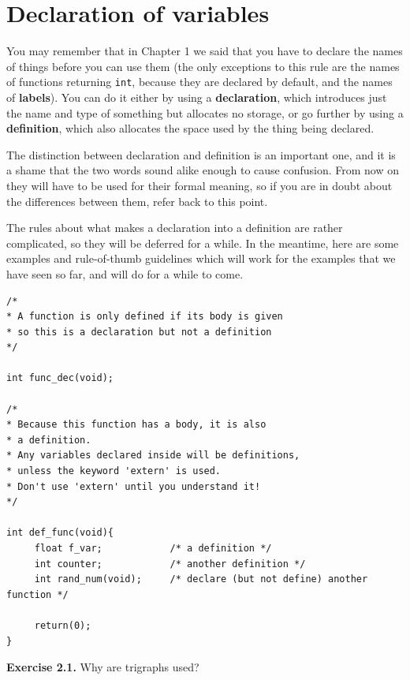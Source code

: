  

 
        \section{Declaration of variables}
        

  

  You may remember that in Chapter 1 we said that you have to
   declare the names of things before you can use them (the only exceptions to
   this rule are the names of functions returning \texttt{int}, because
   they are declared by default, and the names of \textbf{labels}). You can
   do it either by using a \textbf{declaration}, which introduces just the
   name and type of something but allocates no storage, or go further by using
   a \textbf{definition}, which also allocates the space used by the thing
   being declared.


  The distinction between declaration and definition is an important one,
   and it is a shame that the two words sound alike enough to cause confusion.
   From now on they will have to be used for their formal meaning, so if you
   are in doubt about the differences between them, refer back to this
   point.


  The rules about what makes a declaration into a definition are rather
   complicated, so they will be deferred for a while. In the meantime, here
   are some examples and rule-of-thumb guidelines which will work for the
   examples that we have seen so far, and will do for a while to come.


  \begin{Verbatim}
/*
* A function is only defined if its body is given
* so this is a declaration but not a definition
*/

int func_dec(void);

/*
* Because this function has a body, it is also
* a definition.
* Any variables declared inside will be definitions,
* unless the keyword 'extern' is used.
* Don't use 'extern' until you understand it!
*/

int def_func(void){
     float f_var;            /* a definition */
     int counter;            /* another definition */
     int rand_num(void);     /* declare (but not define) another function */

     return(0);
}
\end{Verbatim}

  

   \textbf{Exercise 2.1.} Why are trigraphs used?


